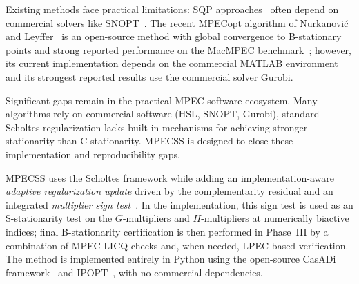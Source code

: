Existing methods face practical limitations: SQP approaches~\cite{FletcherLeyffer2004}
often depend on commercial solvers like SNOPT~\cite{GillMurraySaunders2005SNOPT}. The
recent MPECopt algorithm of Nurkanovi\'{c} and
Leyffer~\cite{NurkanovicLeyffer2025} is an open-source method with
global convergence to B-stationary points and strong reported
performance on the MacMPEC benchmark~\cite{Leyffer2000}; however, its
current implementation depends on the commercial MATLAB environment and
its strongest reported results use the commercial solver Gurobi.

Significant gaps remain in the practical MPEC software ecosystem. Many
algorithms rely on commercial software (HSL, SNOPT, Gurobi), standard
Scholtes regularization lacks built-in mechanisms for achieving
stronger stationarity than C-stationarity. MPECSS is designed to close these implementation and reproducibility gaps.

MPECSS uses the Scholtes framework while adding an implementation-aware
\emph{adaptive regularization update} driven by the
complementarity residual and an integrated \emph{multiplier sign test}~\cite{ScheelScholtes2000}. In the implementation, this sign
test is used as an S-stationarity test on the $G$-multipliers and
$H$-multipliers at numerically biactive indices; final B-stationarity
certification is then performed in Phase~III by a combination of
MPEC-LICQ checks and, when needed, LPEC-based verification. The method
is implemented entirely in Python using the open-source CasADi
framework~\cite{AnderssonGillisHornRawlingsDiehl2019} and
IPOPT~\cite{WachterBiegler2006}, with no commercial dependencies.

